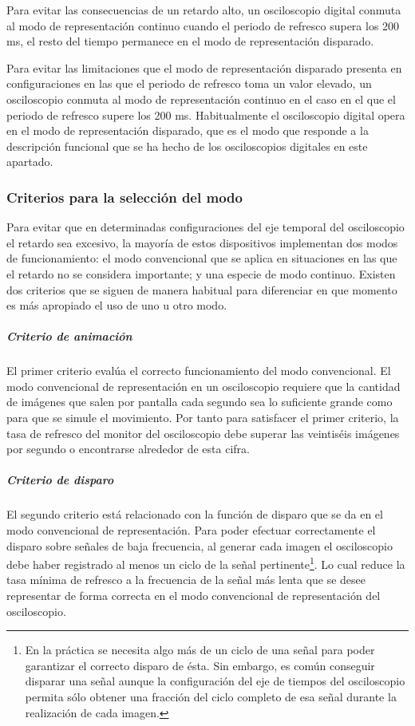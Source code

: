 Para evitar las consecuencias de un retardo alto, un osciloscopio digital
conmuta al modo de representación continuo cuando el periodo de refresco
supera los 200 ms, el resto del tiempo permanece en el modo de
representación disparado. %

Para evitar las limitaciones que el modo de representación disparado
presenta en configuraciones en las que el periodo de refresco toma un valor
elevado, un osciloscopio conmuta al modo de representación continuo en el
caso en el que el periodo de refresco supere los 200 ms. Habitualmente el
osciloscopio digital opera en el modo de representación disparado, que es
el modo que responde a la descripción funcional que se ha hecho de los
osciloscopios digitales en este apartado.


\subsubsection{Criterios para la selección del modo}

Para evitar que en determinadas configuraciones del eje temporal del
osciloscopio el retardo sea excesivo, la mayoría de estos dispositivos
implementan dos modos de funcionamiento: el modo convencional que se aplica
en situaciones en las que el retardo no se considera importante; y una
especie de modo continuo. Existen dos criterios que se siguen de manera
habitual para diferenciar en que momento es más apropiado el uso de uno u
otro modo.


\subparagraph{Criterio de animación}

El primer criterio evalúa el correcto funcionamiento del modo convencional.
El modo convencional de representación en un osciloscopio requiere que la
cantidad de imágenes que salen por pantalla cada segundo sea lo suficiente
grande como para que se simule el movimiento. Por tanto para satisfacer el
primer criterio, la tasa de refresco del monitor del osciloscopio debe
superar las veintiséis imágenes por segundo o encontrarse alrededor de esta
cifra.


\subparagraph{Criterio de disparo}

El segundo criterio está relacionado con la función de disparo que se da en
el modo convencional de representación. Para poder efectuar correctamente
el disparo sobre señales de baja frecuencia, al generar cada imagen el
osciloscopio debe haber registrado al menos un ciclo de la señal
pertinente\footnote{En la práctica se necesita algo más de un ciclo de una
señal para poder garantizar el correcto disparo de ésta. Sin embargo, es
común conseguir disparar una señal aunque la configuración del eje de
tiempos del osciloscopio permita sólo obtener una fracción del ciclo
completo de esa señal durante la realización de cada imagen.}. Lo cual
reduce la tasa mínima de refresco a la frecuencia de la señal más lenta que
se desee representar de forma correcta en el modo convencional de
representación del osciloscopio.

